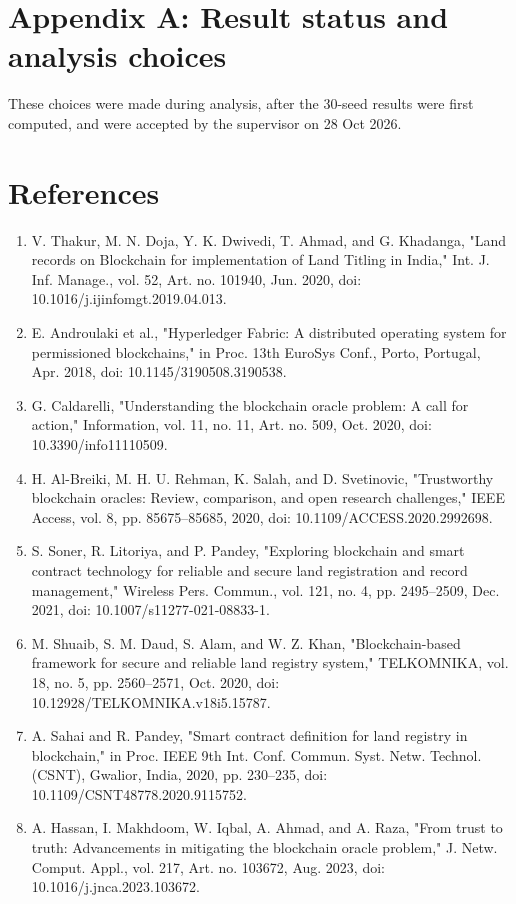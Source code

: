 \documentclass[10pt]{article}
\begin{document}
\section*{Appendix A: Result status and analysis choices}


These choices were made during analysis, after the 30-seed results were first computed, and were accepted by the supervisor on 28 Oct 2026.

\section*{References}\footnotesize
\begin{enumerate}
\item V. Thakur, M. N. Doja, Y. K. Dwivedi, T. Ahmad, and G. Khadanga, "Land records on Blockchain for implementation of Land Titling in India," Int. J. Inf. Manage., vol. 52, Art. no. 101940, Jun. 2020, doi: 10.1016/j.ijinfomgt.2019.04.013.
\item E. Androulaki et al., "Hyperledger Fabric: A distributed operating system for permissioned blockchains," in Proc. 13th EuroSys Conf., Porto, Portugal, Apr. 2018, doi: 10.1145/3190508.3190538.
\item G. Caldarelli, "Understanding the blockchain oracle problem: A call for action," Information, vol. 11, no. 11, Art. no. 509, Oct. 2020, doi: 10.3390/info11110509.
\item H. Al-Breiki, M. H. U. Rehman, K. Salah, and D. Svetinovic, "Trustworthy blockchain oracles: Review, comparison, and open research challenges," IEEE Access, vol. 8, pp. 85675–85685, 2020, doi: 10.1109/ACCESS.2020.2992698.
\item S. Soner, R. Litoriya, and P. Pandey, "Exploring blockchain and smart contract technology for reliable and secure land registration and record management," Wireless Pers. Commun., vol. 121, no. 4, pp. 2495–2509, Dec. 2021, doi: 10.1007/s11277-021-08833-1.
\item M. Shuaib, S. M. Daud, S. Alam, and W. Z. Khan, "Blockchain-based framework for secure and reliable land registry system," TELKOMNIKA, vol. 18, no. 5, pp. 2560–2571, Oct. 2020, doi: 10.12928/TELKOMNIKA.v18i5.15787.
\item A. Sahai and R. Pandey, "Smart contract definition for land registry in blockchain," in Proc. IEEE 9th Int. Conf. Commun. Syst. Netw. Technol. (CSNT), Gwalior, India, 2020, pp. 230–235, doi: 10.1109/CSNT48778.2020.9115752.
\item A. Hassan, I. Makhdoom, W. Iqbal, A. Ahmad, and A. Raza, "From trust to truth: Advancements in mitigating the blockchain oracle problem," J. Netw. Comput. Appl., vol. 217, Art. no. 103672, Aug. 2023, doi: 10.1016/j.jnca.2023.103672.

\end{enumerate}
\end{document}
